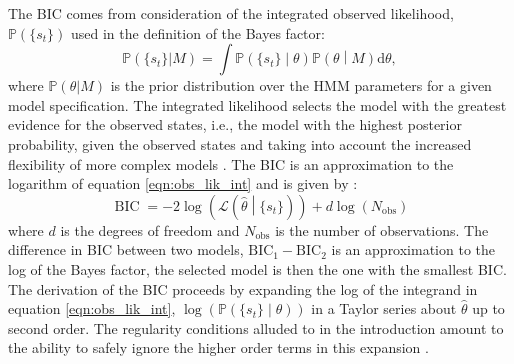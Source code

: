 The BIC comes from consideration of the integrated observed likelihood, $\mathbb{P}\left(\{s_t\}\right)$ used in the definition of the Bayes factor: 
\begin{equation}\label{eqn:obs_lik_int}
       \mathbb{P}\left(\{s_t\}|M\right) = \int \mathbb{P}\left(\{s_t\}\middle|\theta \right)\mathbb{P}\left(\theta \middle | M\right) \mathrm{d}\theta,
\end{equation}
where $\mathbb{P}(\theta|M)$ is the prior distribution over the HMM parameters for a given model specification. The integrated likelihood selects the model with the greatest evidence for the observed states, i.e., the model with the highest posterior probability, given the observed states and taking into account the increased flexibility of more complex models \cite{mackay2003information,kassBayesFactors1995}. The BIC is an approximation to the logarithm of equation \ref{eqn:obs_lik_int} and is given by \cite{schwarzEstimatingDimensionModel1978a}:
\begin{equation}\label{eqn:bic}
    \operatorname{BIC} = -2\log{\left(\mathcal{L}\left(\hat{\theta}\middle| \{s_t\}\right)\right)} + d\log{\left(N_{\mathrm{obs}}\right)}
\end{equation}
where $d$ is the degrees of freedom and $N_{\mathrm{obs}}$ is the number of observations.  The difference in BIC between two models, $\mathrm{BIC}_{1}-\mathrm{BIC}_{2}$ is an approximation to the log of the Bayes factor, the selected model is then the one with the smallest BIC.  The derivation of the BIC proceeds by expanding the log of the integrand in equation \ref{eqn:obs_lik_int},  $\log{\left(\mathbb{P}\left(\{s_{t}\}\middle |\theta \right)\right)}$ in a Taylor series about $\hat{\theta}$ up to second order. The regularity conditions alluded to in the introduction amount to the ability to safely ignore the higher order terms in this expansion \cite{mclachlanFiniteMixtureModels2000}.

